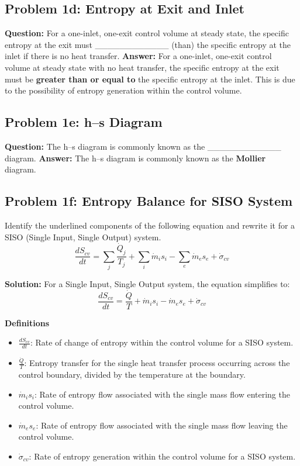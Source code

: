 \documentclass[11pt, letterpaper]{article}
\begin{document}
\subsection*{Problem 1d: Entropy at Exit and Inlet}
\textbf{Question:} For a one-inlet, one-exit control volume at steady state, the specific entropy at the exit must \_\_\_\_\_\_\_\_\_\_\_\_ (than) the specific entropy at the inlet if there is no heat transfer.
\newline\textbf{Answer:} For a one-inlet, one-exit control volume at steady state with no heat transfer, the specific entropy at the exit must be \textbf{greater than or equal to} the specific entropy at the inlet. This is due to the possibility of entropy generation within the control volume.

\subsection*{Problem 1e: h–s Diagram}
\textbf{Question:} The h–s diagram is commonly known as the \_\_\_\_\_\_\_\_\_\_\_\_ diagram.
\newline\textbf{Answer:} The h–s diagram is commonly known as the \textbf{Mollier} diagram.

\subsection*{Problem 1f: Entropy Balance for SISO System}
Identify the underlined components of the following equation and rewrite it for a SISO (Single Input, Single Output) system.
\[ \frac{dS_{cv}}{dt} = \sum_j \frac{\dot{Q}_j}{T_j} + \sum_i \dot{m}_i s_i - \sum_e \dot{m}_e s_e + \dot{\sigma}_{cv} \]

\textbf{Solution:}
For a Single Input, Single Output system, the equation simplifies to:
\[ \frac{dS_{cv}}{dt} = \frac{\dot{Q}}{T} + \dot{m}_i s_i - \dot{m}_e s_e + \dot{\sigma}_{cv} \]

\textbf{Definitions}
\begin{itemize}
    \item \( \frac{dS_{cv}}{dt} \): Rate of change of entropy within the control volume for a SISO system.
    \item \( \frac{\dot{Q}}{T} \): Entropy transfer for the single heat transfer process occurring across the control boundary, divided by the temperature at the boundary.
    \item \( \dot{m}_i s_i \): Rate of entropy flow associated with the single mass flow entering the control volume.
    \item \( \dot{m}_e s_e \): Rate of entropy flow associated with the single mass flow leaving the control volume.
    \item \( \dot{\sigma}_{cv} \): Rate of entropy generation within the control volume for a SISO system.
\end{itemize}
\end{document}
